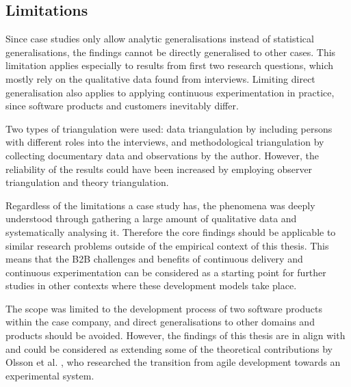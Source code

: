 \documentclass[english, grading]{tktltiki2}
\theoremstyle{definition}
\theoremstyle{remark}
\begin{document}









\subsection{Limitations}
Since case studies only allow analytic generalisations instead of statistical generalisations, the findings cannot be directly generalised to other cases. This limitation applies especially to results from first two research questions, which mostly rely on the qualitative data found from interviews. Limiting direct generalisation also applies to applying continuous experimentation in practice, since software products and customers inevitably differ. 

Two types of triangulation were used: data triangulation by including persons with different roles into the interviews, and methodological triangulation by collecting documentary data and observations by the author. However, the reliability of the results could have been increased by employing observer triangulation and theory triangulation. 

Regardless of the limitations a case study has, the phenomena was deeply understood through gathering a large amount of qualitative data and systematically analysing it. %
Therefore the core findings should be applicable to similar research problems outside of the empirical context of this thesis. This means that the B2B challenges and benefits of continuous delivery and continuous experimentation can be considered as a starting point for further studies in other contexts where these development models take place.

The scope was limited to the development process of two software products within the case company, and direct generalisations to other domains and products should be avoided. However, the findings of this thesis are in align with and could be considered as extending some of the theoretical contributions by Olsson et al. \cite{olsson2012climbing}, who researched the transition from agile development towards an experimental system. 
\end{document}
